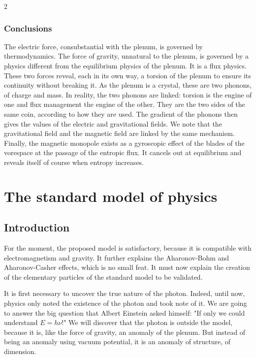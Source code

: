 \begin{multicols}{2}
	\subsubsection{Conclusions}
	
	The electric force, consubstantial with the plenum, is governed by 
	thermodynamics. The force of gravity, unnatural to the plenum, is 
	governed by a physics different from the equilibrium physics of the 
	plenum. It is a flux physics. These two forces reveal, each in its own 
	way, a torsion of the plenum to ensure its continuity without 
	breaking it. As the plenum is a crystal, these are two phonons, of 
	charge and mass. In reality, the two phonons are linked: torsion is the 
	engine of one and flux management the engine of the other. They are 
	the two sides of the same coin, according to how they are used. The 
	gradient of the phonons then gives the values of the electric and 
	gravitational fields. We note that the gravitational field and the 
	magnetic field are linked by the same mechanism. Finally, the 
	magnetic monopole exists as a gyroscopic effect of the blades of the 
	vorespace at the passage of the entropic flux. It cancels out at 
	equilibrium and reveals itself of course when entropy increases.
	
	
	\section{The standard model of physics}
	
	\subsection{Introduction}
	
	For the moment, the proposed model is satisfactory, because it is 
	compatible with electromagnetism and gravity. It further explains the 
	Aharonov-Bohm and Aharonov-Casher effects, which is no small feat. It 
	must now explain the creation of the elementary particles of the 
	standard model to be validated.
	
	It is first necessary to uncover the true nature of the photon. Indeed, 
	until now, physics only noted the existence of the photon and took note 
	of it. We are going to answer the big question that Albert Einstein 
	asked himself: "If only we could understand $E=h\nu$!"\cite{einstein1994correspondence} 
	We will discover that the photon is outside the model, because it is, 
	like the force of gravity, an anomaly of the plenum. But instead of 
	being an anomaly using vacuum potential, it is an anomaly of 
	structure, of dimension.
	

\end{multicols}
